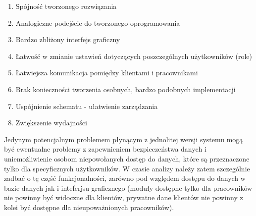 \begin{enumerate}
	\item Spójność tworzonego rozwiązania
	\item Analogiczne podejście do tworzonego oprogramowania
	\item Bardzo zbliżony interfejs graficzny
	\item Łatwość w zmianie ustawień dotyczących poszczególnych użytkowników (role)
	\item Łatwiejsza komunikacja pomiędzy klientami i pracownikami
	\item Brak konieczności tworzenia osobnych, bardzo podobnych implementacji
	\item Uspójnienie schematu - ułatwienie zarządzania
	\item Zwiększenie wydajności
\end{enumerate}

Jedynym potencjalnym problemem płynącym z jednolitej wersji systemu mogą być
ewentualne problemy z zapewnieniem bezpieczeństwa danych i uniemożliwienie
osobom niepowołanych dostęp do danych, które są przeznaczone tylko dla
specyficznych użytkowników. W czasie analizy należy zatem szczególnie zadbać o
tę część funkcjonalności, zarówno pod względem dostępu do danych w bazie danych
jak i inteferjsu graficznego (moduły dostępne tylko dla pracowników nie powinny
być widoczne dla klientów, prywatne dane klientów nie powinny z kolei być
dostępne dla nieupoważnionych pracowników).




